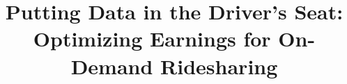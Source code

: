 \documentclass[sigconf]{acmart}
\begin{document}
\title{Putting Data in the Driver's Seat:\\
Optimizing Earnings for On-Demand Ridesharing}


%
%


%
%
% 





\maketitle









%
\balance
 
\end{document}
